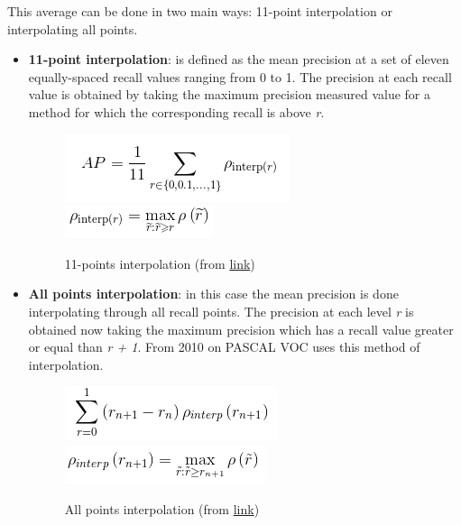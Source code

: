 \begin{itemize}
\begin{figure}[H]
\begin{center}
    \end{center}
    \end{figure}
    This average can be done in two main ways: 11-point interpolation or interpolating all points.
    \begin{itemize}
        \item \textbf{11-point interpolation}: is defined as the mean precision at a set of eleven equally-spaced recall values ranging from 0 to 1. The precision at each recall value is obtained by taking the maximum precision measured value for a method for which the corresponding recall is above \textit{r}.
        \begin{figure}[H]
        \begin{center}
        \includegraphics[scale=0.7]{figures/interp1.png}\\
        \includegraphics[scale=0.7]{figures/interp2.png}
        \caption{11-points interpolation (from \href{https://github.com/rafaelpadilla/Object-Detection-Metrics#11-point-interpolation}{link})}
        \end{center}
        \end{figure}
        \item \textbf{All points interpolation}: in this case the mean precision is done interpolating through all recall points. The precision at each level \textit{r} is obtained now taking the maximum precision which has a recall value greater or equal than \textit{r + 1}. From 2010 on PASCAL VOC uses this method of interpolation.
        \begin{figure}[H]
        \begin{center}
        \includegraphics[scale=0.7]{figures/interp3.png}\\
        \includegraphics[scale=0.7]{figures/interp4.png}
        \caption{All points interpolation (from \href{https://github.com/rafaelpadilla/Object-Detection-Metrics#interpolating-all-points}{link})}
        \end{center}
        \end{figure}
        
    \end{itemize}
\end{itemize}

